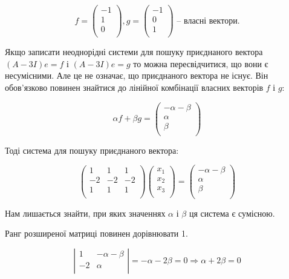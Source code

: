 $$f = \begin{pmatrix}
	-1 \\
	1 \\
	0 \\
\end{pmatrix}, g = \begin{pmatrix}
	-1 \\
	0 \\
	1 \\
\end{pmatrix} \text{ -- власні вектори}. $$

Якщо записати неоднорідні системи для пошуку приєднаного вектора
$(A-3I)e = f$ і $(A-3I)e = g$ то можна пересвідчитися, що вони є
несумісними. Але це не означає, що приєднаного вектора не існує. Він
обов’язково повинен знайтися до лінійної комбінації власних векторів $f$ і $g$:

$$\alpha f + \beta g = \begin{pmatrix}
	-\alpha - \beta \\
	\alpha \\
	\beta \\
\end{pmatrix} $$

Тоді система для пошуку приєднаного вектора:

$$\begin{pmatrix}
	1  & 1  & 1  \\
	-2 & -2 & -2 \\
	1  & 1  & 1  \\
\end{pmatrix} \begin{pmatrix}
	x_1 \\
	x_2 \\
	x_3 \\
\end{pmatrix} = \begin{pmatrix}
	-\alpha - \beta \\
	\alpha \\
	\beta \\
\end{pmatrix} $$

Нам лишається знайти, при яких значеннях $\alpha$ і $\beta$ ця система є сумісною.

Ранг розширеної матриці повинен дорівнювати 1.

$$\left| \begin{matrix}
	1  & - \alpha - \beta \\
	-2 & \alpha \\
\end{matrix} \right| = -\alpha - 2\beta = 0 \Rightarrow \alpha + 2\beta = 0 $$

